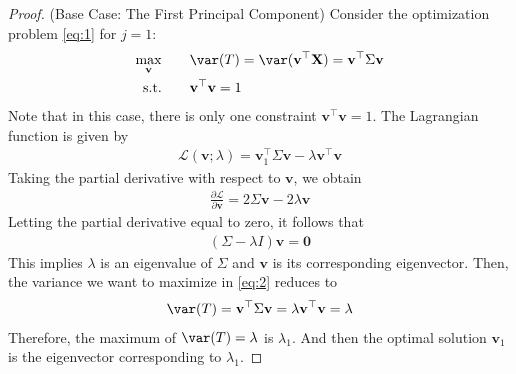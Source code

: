 \documentclass[color=blue, thmcnt=section, 12pt]{elegantbook}
\begin{document}
\begin{proof}
    \par (Base Case: The First Principal Component) Consider the optimization problem \eqref{eq:1} for $j = 1$:
    \begin{alignat}{2}
        \max_{\mathbf{v}}&\quad & &\var(T) = \var(\mathbf{v}^\top \mathbf{X}) = \mathbf{v}^\top \Sigma \mathbf{v} \label{eq:2}\\ 
        \text{s.t.}& & &\mathbf{v}^\top \mathbf{v} = 1 \nonumber
    \end{alignat}
    Note that in this case, there is only one constraint $\mathbf{v}^\top \mathbf{v} = 1$. The Lagrangian function is given by 
    \begin{align*}
        \mathcal{L}(\mathbf{v}; \lambda)
        = \mathbf{v}_1^\top \Sigma \mathbf{v} - \lambda \mathbf{v}^\top \mathbf{v}
    \end{align*}
    Taking the partial derivative with respect to $\mathbf{v}$, we obtain
    \begin{align*}
        \frac{\partial \mathcal{L}}{\partial \mathbf{v}} = 2 \Sigma \mathbf{v} - 2\lambda \mathbf{v}
    \end{align*}
    Letting the partial derivative equal to zero, it follows that 
    \begin{align*}
        (\Sigma - \lambda I)\mathbf{v} = \mathbf{0}
    \end{align*}
    This implies $\lambda$ is an eigenvalue of $\Sigma$ and $\mathbf{v}$ is its corresponding eigenvector. Then, the variance we want to maximize in \eqref{eq:2} reduces to 
    \begin{align*}
        \var(T)
        = \mathbf{v}^\top \Sigma \mathbf{v}
        = \lambda \mathbf{v}^\top \mathbf{v}
        = \lambda
    \end{align*}
    Therefore, the maximum of $\var(T) = \lambda$ is $\lambda_1$. And then the optimal solution $\mathbf{v}_1$ is the eigenvector corresponding to $\lambda_1$.


\end{proof}
\end{document}
